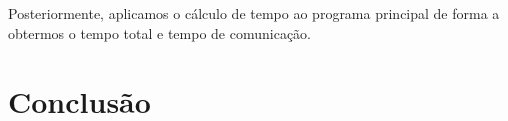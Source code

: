 \documentclass[10pt,a4paper]{article}
\begin{document}
Posteriormente, aplicamos o cálculo de tempo ao programa principal de
forma a obtermos o tempo total e tempo de comunicação.

\section{Conclusão}


\begin{small}
  
\end{small}
\end{document}
